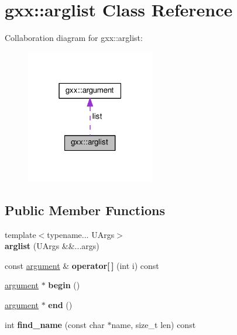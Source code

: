 \hypertarget{classgxx_1_1arglist}{}\section{gxx\+:\+:arglist Class Reference}
\label{classgxx_1_1arglist}


Collaboration diagram for gxx\+:\+:arglist\+:
\nopagebreak
\begin{figure}[H]
\begin{center}
\leavevmode
\includegraphics[width=159pt]{classgxx_1_1arglist__coll__graph}
\end{center}
\end{figure}
\subsection*{Public Member Functions}
\begin{DoxyCompactItemize}
\item 
{\footnotesize template$<$typename... U\+Args$>$ }\\{\bfseries arglist} (U\+Args \&\&...args)\hypertarget{classgxx_1_1arglist_aec50946505f2a8258dff24e8ecb5ea50}{}\label{classgxx_1_1arglist_aec50946505f2a8258dff24e8ecb5ea50}

\item 
const \hyperlink{structgxx_1_1argument}{argument} \& {\bfseries operator\mbox{[}$\,$\mbox{]}} (int i) const \hypertarget{classgxx_1_1arglist_a6d5a62f369976094f60133c6c36c1f1d}{}\label{classgxx_1_1arglist_a6d5a62f369976094f60133c6c36c1f1d}

\item 
\hyperlink{structgxx_1_1argument}{argument} $\ast$ {\bfseries begin} ()\hypertarget{classgxx_1_1arglist_abbde7d4924c0ec1dc88ee050a63c6c04}{}\label{classgxx_1_1arglist_abbde7d4924c0ec1dc88ee050a63c6c04}

\item 
\hyperlink{structgxx_1_1argument}{argument} $\ast$ {\bfseries end} ()\hypertarget{classgxx_1_1arglist_ac58fdac6e49f8436db52e161f65eb97a}{}\label{classgxx_1_1arglist_ac58fdac6e49f8436db52e161f65eb97a}

\item 
int {\bfseries find\+\_\+name} (const char $\ast$name, size\+\_\+t len) const \hypertarget{classgxx_1_1arglist_acbbf22df9ba8ee8e4fd461d0c7357700}{}\label{classgxx_1_1arglist_acbbf22df9ba8ee8e4fd461d0c7357700}

\end{DoxyCompactItemize}
